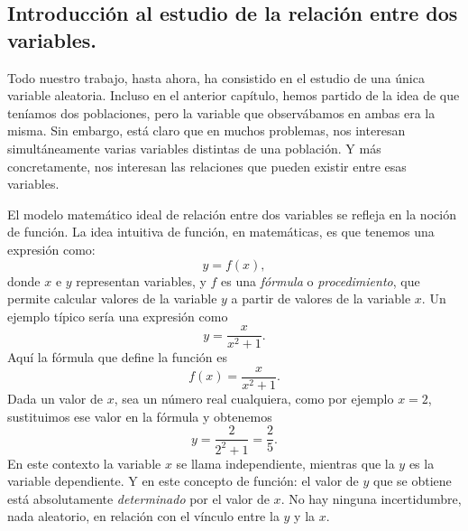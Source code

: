 

\subsection*{Introducción al estudio de la relación entre dos variables.}
\label{part04:intro}

Todo nuestro trabajo, hasta ahora, ha consistido en el estudio de una única variable aleatoria. Incluso en el anterior capítulo, hemos partido de la idea de que teníamos dos poblaciones, pero la variable que observábamos en ambas era la misma. Sin embargo, está claro que en muchos problemas, nos interesan simultáneamente varias variables distintas de una población. Y más concretamente, {\sf nos interesan las relaciones que pueden existir entre esas variables.}

El modelo matemático ideal de relación entre dos variables se refleja en la noción de {\sf función}. La idea intuitiva de función, en matemáticas, es que tenemos una expresión como:
\[y=f(x),\]
donde $x$ e $y$ representan {\sf variables}, y $f$ es una {\em fórmula} o {\em procedimiento}, que permite calcular valores de la variable $y$ a partir de valores de la variable $x$. Un ejemplo típico sería una expresión como
\[y=\frac{x}{x^2+1}.\]
Aquí la fórmula que define la función es
\[f(x)=\frac{x}{x^2+1}.\]
Dada un valor de $x$, sea un número real cualquiera, como por ejemplo $x=2$, sustituimos ese valor en la fórmula y obtenemos
\[y=\frac{2}{2^2+1}=\frac{2}{5}.\]
En este contexto la variable $x$ se llama {\sf independiente}, mientras que la $y$ es la {\sf variable dependiente}. Y en este concepto de función: el valor de $y$ que se obtiene está absolutamente {\em determinado} por el valor de $x$. No hay ninguna incertidumbre, nada aleatorio, en relación con el vínculo entre la $y$ y la $x$.

